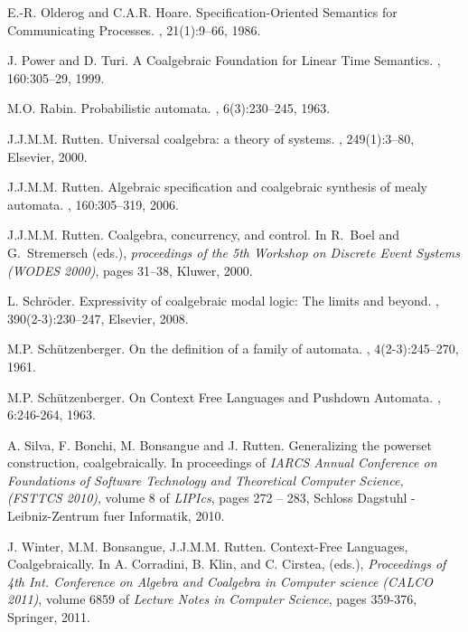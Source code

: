 \documentclass{LMCS}
\begin{document}
\begin{thebibliography}{10}
E.-R. Olderog and C.A.R. Hoare.
\newblock Specification-Oriented Semantics for Communicating Processes.
, 21(1):9--66, 1986.

J. Power and D. Turi.
\newblock A Coalgebraic Foundation for Linear Time Semantics.
, 160:305--29, 1999.

M.O. Rabin.
\newblock Probabilistic automata.
, 6(3):230--245, 1963.

J.J.M.M. Rutten.
\newblock Universal coalgebra: a theory of systems.
, 249(1):3--80, Elsevier, 2000.

J.J.M.M. Rutten.
\newblock Algebraic specification and coalgebraic synthesis of mealy automata.
, 160:305--319, 2006.

J.J.M.M. Rutten.
\newblock Coalgebra, concurrency, and control.
\newblock In R.~Boel and G.~Stremersch (eds.), {\em proceedings of the 5th Workshop
  on Discrete Event Systems (WODES 2000)}, pages 31--38,  Kluwer, 2000.

L. Schr{\"o}der.
\newblock Expressivity of coalgebraic modal logic: The limits and beyond.
, 390(2-3):230--247, Elsevier, 2008.

M.P. Sch{\"u}tzenberger.
\newblock On the definition of a family of automata.
, 4(2-3):245--270, 1961.

M.P. Sch\"{u}tzenberger.
\newblock On Context Free Languages and Pushdown Automata.
, 6:246-264, 1963.

A. Silva, F. Bonchi, M. Bonsangue and J. Rutten.
\newblock Generalizing the powerset construction, coalgebraically.
\newblock In proceedings of {\em IARCS Annual Conference on Foundations
  of Software Technology and Theoretical Computer Science, (FSTTCS 2010)},
  volume 8 of {\em LIPIcs}, pages 272 -- 283, Schloss Dagstuhl - Leibniz-Zentrum
  fuer Informatik, 2010.


J. Winter, M.M. Bonsangue, J.J.M.M. Rutten.
\newblock Context-Free Languages, Coalgebraically.
\newblock In A. Corradini, B. Klin, and C. Cirstea, (eds.), {\em Proceedings of
   4th Int. Conference on Algebra and Coalgebra in Computer science (CALCO 2011)},
   volume 6859 of {\em Lecture Notes in Computer Science}, pages 359-376, Springer, 2011.

\end{thebibliography}
\end{document}
